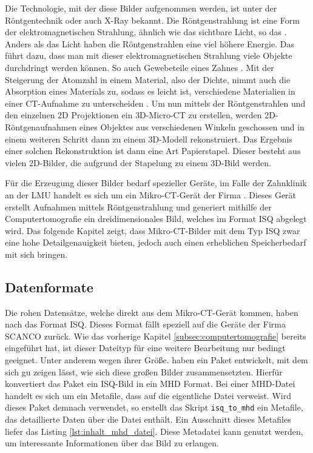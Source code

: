 Die Technologie, mit der diese Bilder aufgenommen werden, ist unter der Röntgentechnik
oder auch \ac{X-Ray} bekannt. Die Röntgenstrahlung ist eine Form der elektromagnetischen
Strahlung, ähnlich wie das sichtbare Licht, so das \citet[K.~1]{nib2024}. Anders
als das Licht haben die Röntgenstrahlen eine viel höhere Energie. Das führt dazu,
dass man mit dieser elektromagnetischen Strahlung viele Objekte durchdringt werden
können. So auch Gewebeteile eines Zahnes \citep[vgl.][K.~1]{nib2024}. Mit der
Steigerung der Atomzahl in einem Material, also der Dichte, nimmt auch die
Absorption eines Materials zu, sodass es leicht ist, verschiedene Materialien in
einer \ac{CT}-Aufnahme zu unterscheiden \citep[vgl.][K.~1]{nib2024}. Um nun mittels
der Röntgenstrahlen und den einzelnen \ac{2D} Projektionen ein \ac{3D}-Micro-\ac{CT}
zu erstellen, werden 2D-Röntgenaufnahmen eines Objektes aus verschiedenen Winkeln
geschossen und in einem weiteren Schritt dann zu einem \ac{3D}-Modell
rekonstruiert. Das Ergebnis einer solchen Rekonstruktion ist dann eine Art Papierstapel.
Dieser besteht aus vielen 2D-Bilder, die aufgrund der Stapelung zu einem \ac{3D}-Bild
werden.

Für die Erzeugung dieser Bilder bedarf spezieller Geräte, im Falle der Zahnklinik
an der \ac{LMU} handelt es sich um ein Mikro-\ac{CT}-Gerät der Firma \citet{scanco2024}.
Dieses Gerät erstellt Aufnahmen mittels Röntgenstrahlung und generiert mithilfe der
Computertomografie ein dreidimensionales Bild, welches im Format \ac{ISQ} abgelegt
wird. Das folgende Kapitel zeigt, dass Mikro-\ac{CT}-Bilder mit dem Typ \ac{ISQ}
zwar eine hohe Detailgenauigkeit bieten, jedoch auch einen erheblichen
Speicherbedarf mit sich bringen.

\subsection{Datenformate}
\label{subsec:datensätze} Die rohen Datensätze, welche direkt aus dem Mikro-\ac{CT}-Gerät
kommen, haben nach \citet{scanco2024} das Format \ac{ISQ}. Dieses Format fällt
speziell auf die Geräte der Firma SCANCO zurück. Wie das vorherige Kapitel \ref{subsec:computertomografie}
bereits eingeführt hat, ist dieser Dateityp für eine weitere Bearbeitung nur
bedingt geeignet. Unter anderem wegen ihrer Größe. \citet[S.~118-119]{RoeschKunzelmann2018}
haben ein Paket entwickelt, mit dem sich gu zeigen lässt, wie sich diese großen Bilder
zusammensetzten. Hierfür konvertiert das Paket ein \ac{ISQ}-Bild in ein \ac{MHD}
Format. Bei einer \ac{MHD}-Datei handelt es sich um ein Metafile, dass auf die eigentliche
Datei verweist. Wird dieses Paket demnach verwendet, so erstellt das Skript \texttt{isq\_to\_mhd}
ein Metafile, das detaillierte Daten über die Datei enthält. Ein Ausschnitt
dieses Metafiles liefer das Listing \ref{lst:inhalt_mhd_datei}. Diese Metadatei kann
genutzt werden, um interessante Informationen über das Bild zu erlangen.

